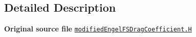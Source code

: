 \subsection{Detailed Description}
{\bfseries Original source file} \href{../../../home/carlo/data/GeN-Foam/GeN-Foam_ffn/GeN-Foam/GeN-Foam/classes/thermalHydraulics/src/physicsModels/dragModels/FSDragCoefficientModels/modifiedEngel/modifiedEngelFSDragCoefficient.H}{\tt modified\+Engel\+F\+S\+Drag\+Coefficient.\+H} 